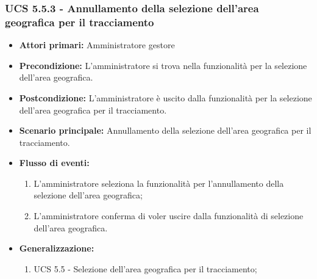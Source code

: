 \subsubsection{UCS 5.5.3 - Annullamento della selezione dell'area geografica per il tracciamento}%
\begin{itemize}
\item \textbf{Attori primari:} Amministratore gestore
\item \textbf{Precondizione:} L'amministratore si trova nella funzionalità per la selezione dell'area geografica.
\item \textbf{Postcondizione:} L'amministratore è uscito dalla funzionalità per la selezione dell'area geografica per il tracciamento.
\item \textbf{Scenario principale:} Annullamento della selezione dell'area geografica per il tracciamento.
\item \textbf{Flusso di eventi:}
    \begin{enumerate}
    \item L'amministratore seleziona la funzionalità per l'annullamento della selezione dell'area geografica;
    \item L'amministratore conferma di voler uscire dalla funzionalità di selezione dell'area geografica.
    \end{enumerate}
    \item \textbf{Generalizzazione:}
	\begin{enumerate}
        \item UCS 5.5 - Selezione dell'area geografica per il tracciamento;
    \end{enumerate}
\end{itemize}